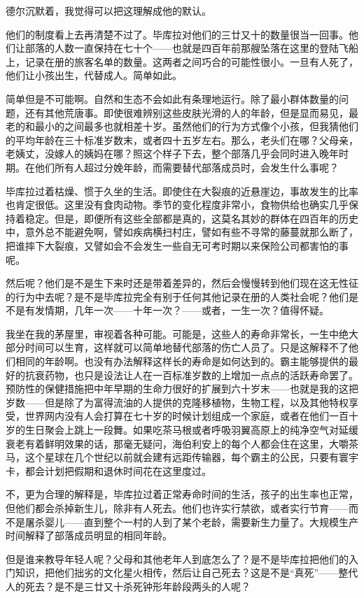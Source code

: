 \documentclass[AutoFakeBold=true]{book}
\begin{document}
德尔沉默着，我觉得可以把这理解成他的默认。

他们的制度看上去再清楚不过了。毕库拉对他们的三廿又十的数量很当一回事。他们让部落的人数一直保持在七十个——也就是四百年前那艘坠落在这里的登陆飞船上，记录在册的旅客名单的数量。这两者之间巧合的可能性很小。一旦有人死了，他们让小孩出生，代替成人。简单如此。

简单但是不可能啊。自然和生态不会如此有条理地运行。除了最小群体数量的问题，还有其他荒唐事。即使很难辨别这些皮肤光滑的人的年龄，但是显而易见，最老的和最小的之间最多也就相差十岁。虽然他们的行为方式像个小孩，但我猜他们的平均年龄在三十标准岁数末，或者四十五岁左右。那么，老头们在哪？父母亲，老姨丈，没嫁人的姨妈在哪？照这个样子下去，整个部落几乎会同时进入晚年时期。在他们所有人超过分娩年龄，而需要替代部落成员时，会发生什么事呢？

毕库拉过着枯燥、惯于久坐的生活。即使住在大裂痕的近悬崖边，事故发生的比率也肯定很低。这里没有食肉动物。季节的变化程度非常小，食物供给也确实几乎保持着稳定。但是，即便所有这些全部都是真的，这莫名其妙的群体在四百年的历史中，意外总不能避免啊，譬如疾病横扫村庄，譬如有些不寻常的藤蔓就那么断了，把谁摔下大裂痕，又譬如会不会发生一些自无可考时期以来保险公司都害怕的事呢。

然后呢？他们是不是生下来时还是带着差异的，然后会慢慢转到他们现在这无性征的行为中去呢？是不是毕库拉完全有别于任何其他记录在册的人类社会呢？他们是不是有发情期，几年一次——十年一次？——或者，一生一次？值得怀疑。

我坐在我的茅屋里，审视着各种可能。可能是，这些人的寿命非常长，一生中绝大部分时间可以生育，这样就可以简单地替代部落的伤亡人员了。只是这解释不了他们相同的年龄啊。也没有办法解释这样长的寿命是如何达到的。霸主能够提供的最好的抗衰药物，也只是设法让人在一百标准岁数的上增加一点点的活跃寿命罢了。预防性的保健措施把中年早期的生命力很好的扩展到六十岁末——也就是我的这把岁数——但是除了为富得流油的人提供的克隆移植物，生物工程，以及其他特权享受，世界网内没有人会打算在七十岁的时候计划组成一个家庭，或者在他们一百十岁的生日聚会上跳上一段舞。如果吃茶马根或者呼吸羽翼高原上的纯净空气对延缓衰老有着鲜明效果的话，那毫无疑问，海伯利安上的每个人都会住在这里，大嚼茶马，这个星球在几个世纪以前就会建有远距传输器，每个霸主的公民，只要有寰宇卡，都会计划把假期和退休时间花在这里度过。

不，更为合理的解释是，毕库拉过着正常寿命时间的生活，孩子的出生率也正常，但他们都会杀掉新生儿，除非有人死去。他们也许实行禁欲，或者实行节育——而不是屠杀婴儿——直到整个一村的人到了某个老龄，需要新生力量了。大规模生产时间解释了部落成员明显的相同年龄。

但是谁来教导年轻人呢？父母和其他老年人到底怎么了？是不是毕库拉把他们的入门知识，把他们拙劣的文化星火相传，然后让自己死去？这是不是``真死''——整代人的死去？是不是三廿又十杀死钟形年龄段两头的人呢？
\end{document}
